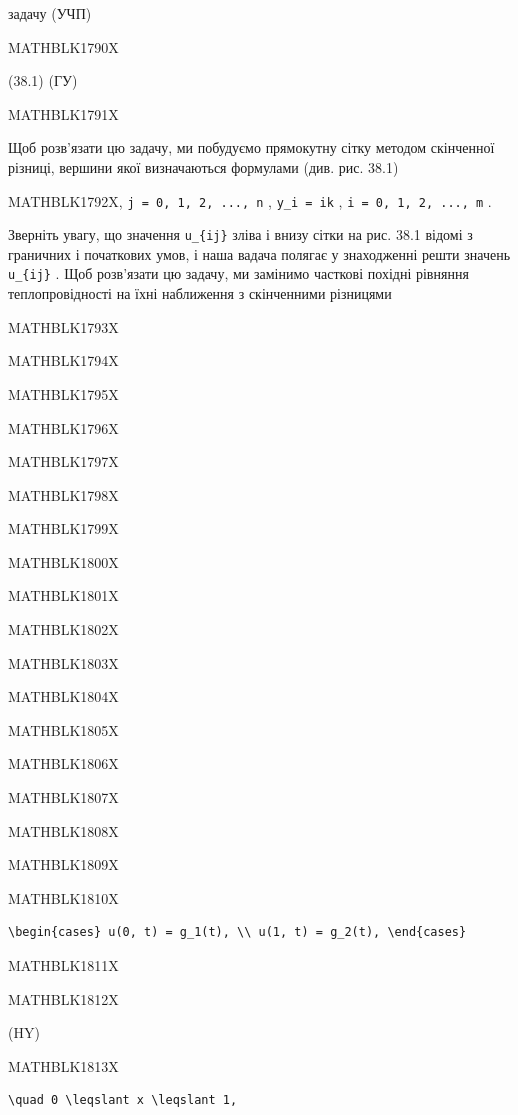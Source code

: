 \documentclass[
  ukrainian,
]{article}
\begin{document}
задачу (УЧП)

MATHBLK1790X

(38.1) (ГУ)

MATHBLK1791X

Щоб розв'язати цю задачу, ми побудуємо прямокутну сітку методом
скінченної різниці, вершини якої визначаються формулами (див. рис. 38.1)

MATHBLK1792X, \texttt{j\ =\ 0,\ 1,\ 2,\ ...,\ n} , \texttt{y\_i\ =\ ik}
, \texttt{i\ =\ 0,\ 1,\ 2,\ ...,\ m} .

Зверніть увагу, що значення \texttt{u\_\{ij\}} зліва і внизу сітки на
рис. 38.1 відомі з граничних і початкових умов, і наша вадача полягає у
знаходженні решти значень \texttt{u\_\{ij\}} . Щоб розв'язати цю задачу,
ми замінимо часткові похідні рівняння теплопровідності на їхні
наближення з скінченними різницями

MATHBLK1793X

MATHBLK1794X

MATHBLK1795X

MATHBLK1796X

MATHBLK1797X

MATHBLK1798X

MATHBLK1799X

MATHBLK1800X

MATHBLK1801X

MATHBLK1802X

MATHBLK1803X

MATHBLK1804X

MATHBLK1805X

MATHBLK1806X

MATHBLK1807X

MATHBLK1808X

MATHBLK1809X

MATHBLK1810X

\begin{verbatim}
\begin{cases} u(0, t) = g_1(t), \\ u(1, t) = g_2(t), \end{cases}
\end{verbatim}

MATHBLK1811X

MATHBLK1812X

(HY)

MATHBLK1813X

\begin{verbatim}
\quad 0 \leqslant x \leqslant 1,
\end{verbatim}
\end{document}
